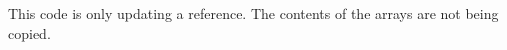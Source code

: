 \inputminted{csharp}{\context/answer/Calendar.cs}

This code is only updating a reference. The contents of the arrays are not being copied.
